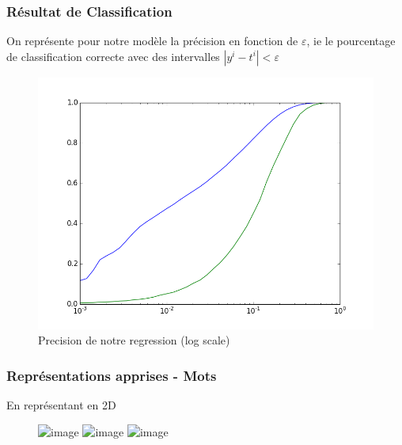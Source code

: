 \documentclass{beamer}
\begin{document}
\begin{frame}
\frametitle{Résultat de Classification}
On représente pour notre modèle la précision en fonction de $\varepsilon$, ie le pourcentage de classification correcte avec des intervalles $|y^i-t^i|<\varepsilon$
\begin{figure}[htp]
\centering
\includegraphics[scale=0.4]{fig/log_eps_curve.png}
\caption{Precision de notre regression (log scale)}
\end{figure}

\end{frame}



\begin{frame}
\frametitle{Représentations apprises - Mots}
 En représentant en 2D
\begin{figure}[htp]
\centering
\includegraphics<1->[width=0.45\textwidth]{fig/WordPlot.png}
\includegraphics<2>[width=0.45\textwidth]{fig/NewModelPCA.png}
\includegraphics<3>[width=0.45\textwidth]{fig/model2d.png}
\caption{}
\end{figure}

\end{frame}
\end{document}
